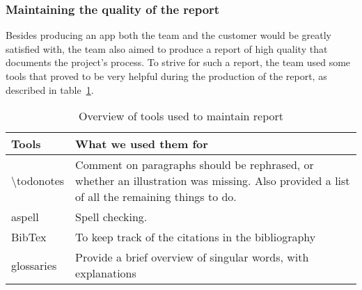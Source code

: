 \subsubsection{Maintaining the quality of the report}
Besides producing an app both the team and the customer would be greatly satisfied with, the team also aimed to produce a report of high quality that documents the project's process. To strive for such a report, the team used some tools that proved to be very helpful during the production of the report, as described in table~\ref{tab:reportTools}.

\begin{table}[H]
\begin{tabular}{|l|p{13cm}|}
\hline
\textbf{Tools} & \textbf{What we used them for}\\\hline
\textbackslash todonotes&Comment on paragraphs should be rephrased, or whether an illustration was missing. Also provided a list of all the remaining things to do.\\\hline
aspell & Spell checking.\\\hline
BibTex&To keep track of the citations in the bibliography\\\hline
glossaries& Provide a brief overview of singular words, with explanations\\\hline
\end{tabular}
\caption{Overview of tools used to maintain report}
\label{tab:reportTools}
\end{table}

\begin{comment}
\noindent\textbf{\textbackslash todonotes}\\
Feedback is key when creating a product. The \textbackslash todonotes~\cite{todo} package allowed the team to comment on paragraphs and formulations we wanted to rephrase, whether an illustration was missing, and also gave us a list of all the things we had to do, making it easy to get an overview of the remaining tasks regarding the report.\\

\noindent\textbf{Spell checking: aspell}\\
Although manual proofreading cannot be avoided, it is advantageous to have a tool to perform automatic spell checking. Aspell~\cite{aspell} is such a tool.\\

\noindent\textbf{References and glossary}\\
To keep track of the citations in the bibliography in the report, we used a LaTeX-package called BibTex~\cite{bibtex}, and for our glossaries, a package called glossaries~\cite{glossaries}.

\end{comment}
